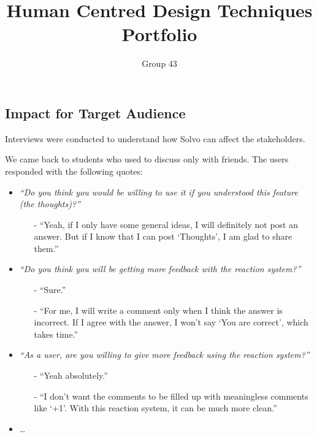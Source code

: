 \documentclass[a4paper]{article}
\begin{document}
    \title{
        \vspace{-3em}
        Human Centred Design Techniques Portfolio}
    \author{
        Group 43
    }
    \date{\vspace{-2em}}
    \maketitle

    \subsection*{Impact for Target Audience}

    Interviews were conducted to understand how Solvo can affect the stakeholders.

    We came back to students who used to discuss only with friends.
    The users responded with the following quotes:
    \begin{itemize}
        \item \textit{``Do you think you would be willing to use it if you understood this feature (the thoughts)?''}
        \begin{itemize}
            \item[-] ``Yeah, if I only have some general ideas, I will definitely not post an answer.
            But if I know that I can post `Thoughts', I am glad to share them.''
        \end{itemize}

        \item \textit{``Do you think you will be getting more feedback with the reaction system?''}
        \begin{itemize}
            \item[-] ``Sure.''
            \item[-] ``For me, I will write a comment only when I think the answer is incorrect.
            If I agree with the answer, I won't say `You are correct', which takes time.''
        \end{itemize}

        \item
        \textit{``As a user, are you willing to give more feedback using the reaction system?''}
        \begin{itemize}
            \item[-] ``Yeah absolutely.''
            \item[-] ``I don’t want the comments to be filled up with meaningless comments like `+1'.
            With this reaction system, it can be much more clean.''
        \end{itemize}
        \item \ldots
    \end{itemize}
\end{document}
